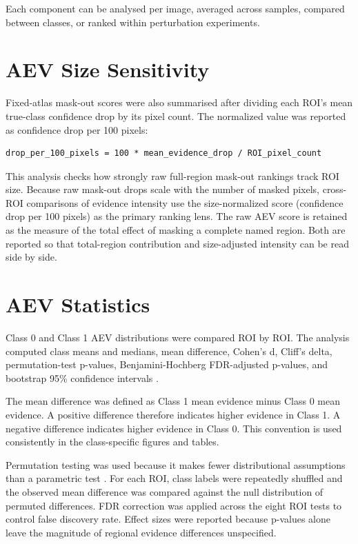Each component can be analysed per image, averaged across samples, compared between classes, or ranked within perturbation experiments.


\section{AEV Size Sensitivity}

Fixed-atlas mask-out scores were also summarised after dividing each ROI's mean true-class confidence drop by its pixel count. The normalized value was reported as confidence drop per 100 pixels:


\begin{verbatim}
drop_per_100_pixels = 100 * mean_evidence_drop / ROI_pixel_count
\end{verbatim}

This analysis checks how strongly raw full-region mask-out rankings track ROI size. Because raw mask-out drops scale with the number of masked pixels, cross-ROI comparisons of evidence intensity use the size-normalized score (confidence drop per 100 pixels) as the primary ranking lens. The raw AEV score is retained as the measure of the total effect of masking a complete named region. Both are reported so that total-region contribution and size-adjusted intensity can be read side by side.


\section{AEV Statistics}

Class 0 and Class 1 AEV distributions were compared ROI by ROI. The analysis computed class means and medians, mean difference, Cohen's d, Cliff's delta, permutation-test p-values, Benjamini-Hochberg FDR-adjusted p-values, and bootstrap 95\% confidence intervals    .


The mean difference was defined as Class 1 mean evidence minus Class 0 mean evidence. A positive difference therefore indicates higher evidence in Class 1. A negative difference indicates higher evidence in Class 0. This convention is used consistently in the class-specific figures and tables.


Permutation testing was used because it makes fewer distributional assumptions than a parametric test . For each ROI, class labels were repeatedly shuffled and the observed mean difference was compared against the null distribution of permuted differences. FDR correction was applied across the eight ROI tests to control false discovery rate. Effect sizes were reported because p-values alone leave the magnitude of regional evidence differences unspecified.



